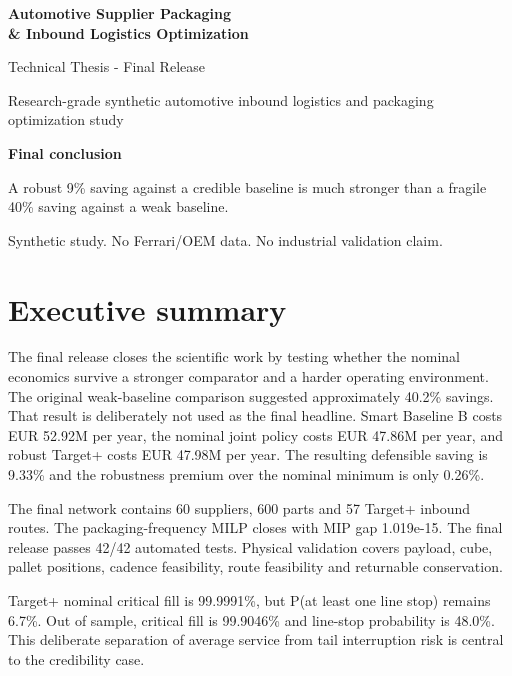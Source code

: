 \documentclass[11pt]{article}
\begin{document}
\begin{titlepage}
\centering
\vspace*{2.3cm}
{\Huge\bfseries\color{navy} Automotive Supplier Packaging\\[0.25cm]\& Inbound Logistics Optimization\par}
\vspace{0.6cm}
{\Large Technical Thesis - Final Release\par}
\vspace{1.2cm}
{\large Research-grade synthetic automotive inbound logistics and packaging optimization study\par}
\vfill
\begin{minipage}{0.84\textwidth}
\centering
\textbf{Final conclusion}\par\vspace{0.25cm}
A robust 9\% saving against a credible baseline is much stronger than a fragile 40\% saving against a weak baseline.
\end{minipage}
\vfill
{\small Synthetic study. No Ferrari/OEM data. No industrial validation claim.}\par
\end{titlepage}
\tableofcontents
\listoffigures
\clearpage{}
\section{Executive summary}
The final release closes the scientific work by testing whether the nominal economics survive a stronger comparator and a harder operating environment. The original weak-baseline comparison suggested approximately 40.2\% savings. That result is deliberately not used as the final headline. Smart Baseline B costs EUR 52.92M per year, the nominal joint policy costs EUR 47.86M per year, and robust Target+ costs EUR 47.98M per year. The resulting defensible saving is 9.33\% and the robustness premium over the nominal minimum is only 0.26\%.

The final network contains 60 suppliers, 600 parts and 57 Target+ inbound routes. The packaging-frequency MILP closes with MIP gap 1.019e-15. The final release passes 42/42 automated tests. Physical validation covers payload, cube, pallet positions, cadence feasibility, route feasibility and returnable conservation.

Target+ nominal critical fill is 99.9991\%, but P(at least one line stop) remains 6.7\%. Out of sample, critical fill is 99.9046\% and line-stop probability is 48.0\%. This deliberate separation of average service from tail interruption risk is central to the credibility case.
\end{document}
